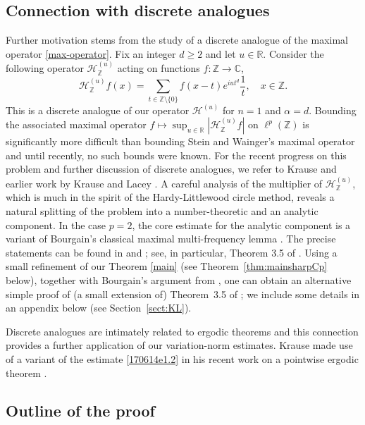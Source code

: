 \documentclass[12pt,leqno]{amsart}
\def\R{\mathbb{R}}
\def\C{\mathbb{C}}
\def\Z{\mathbb{Z}}
\theoremstyle{plain}
\numberwithin{equation}{section}
\begin{document}
\subsection{Connection with discrete analogues}\label{sec:discranalogue}
Further motivation stems from the study of a discrete analogue of the maximal operator \eqref{max-operator}. Fix an integer $d\ge 2$ and let $u\in\R$. Consider the following operator $\mathcal{H}^{(u)}_\Z$ acting on functions $f:\Z\to\C$,
\[ \mathcal{H}_\Z^{(u)} f(x) = \sum_{t\in\Z\setminus\{0\}} f(x-t) e^{iu t^d} \frac1{t},\quad x\in\Z. \]
This is a discrete analogue of our operator $\mathcal{H}^{(u)}$ for $n=1$ and $\alpha=d$. Bounding the associated maximal operator $f\mapsto \sup_{u\in\R} |\mathcal{H}_\Z^{(u)} f|$ on $\ell^p(\Z)$ is significantly more difficult than bounding Stein and Wainger's maximal operator and until recently, no such bounds were known. For the recent progress on this problem and further discussion of discrete analogues, we refer to Krause \cite{Kra18} and earlier work by Krause and Lacey \cite{MR3658135}.
A careful analysis of the multiplier of $\mathcal{H}_\Z^{(u)}$, which is much in the spirit of the Hardy-Littlewood circle method, reveals a natural splitting of the problem into a number-theoretic and an analytic component. 
In the case $p=2$, the core estimate for the analytic component is a variant of Bourgain's classical maximal multi-frequency lemma \cite[Lemma 4.1]{MR1019960}. The precise statements can be found in \cite[Section 3]{MR3658135} and \cite[Sections 5 and 10.2]{Kra18}; see, in particular, Theorem 3.5 of \cite{MR3658135}. 
Using a small refinement of our Theorem \ref{main} (see Theorem~\ref{thm:mainsharpCp} below), together with Bourgain's argument from \cite{MR1019960}, one can obtain an alternative simple proof of (a small extension of) Theorem~3.5 of \cite{MR3658135}; we include some details in an appendix below (see Section~\ref{sect:KL}). 

Discrete analogues are intimately related to ergodic theorems and this connection provides a further application of our variation-norm estimates. Krause made use of a variant of the estimate \eqref{170614e1.2} in his recent work on a pointwise ergodic theorem \cite[Theorem 1.2]{Kra18}.

\subsection{Outline of the proof}
\end{document}
